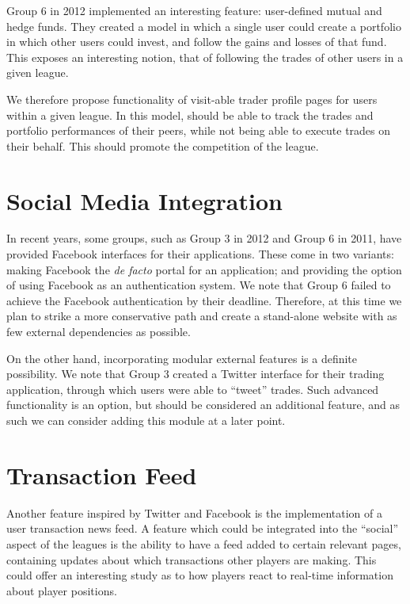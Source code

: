 \documentclass[11pt,letterpaper,oneside]{memoir}
\begin{document}
Group 6 in 2012 implemented an interesting feature: user-defined mutual and hedge funds.
They created a model in which a single user could create a portfolio in which other 
users could invest, and follow the gains and losses of that fund. This exposes an interesting
notion, that of following the trades of other users in a given league. 

We therefore propose functionality of visit-able trader profile pages for 
users within a given league. In this model, should be able to track the trades 
and portfolio performances of their peers, while not being able to execute trades 
on their behalf. This should promote the competition of the league.

\section{Social Media Integration}

In recent years, some groups, such as Group 3 in 2012 and Group 6 in 2011, have provided
Facebook interfaces for their applications. These come in two variants: making Facebook
the \emph{de facto} portal for an application; and providing the option of using Facebook
as an authentication system. We note that Group 6 failed to achieve the Facebook authentication
by their deadline. Therefore, at this time we plan to strike a more conservative path and
create a stand-alone website with as few external dependencies as possible.

On the other hand, incorporating modular external features is a definite possibility. We note
that Group 3 created a Twitter interface for their trading application, through which users
were able to ``tweet'' trades. Such advanced functionality is an option, but should be considered
an additional feature, and as such we can consider adding this module at a later point.

\section{Transaction Feed}

Another feature inspired by Twitter and Facebook is the implementation of a user transaction
news feed. A feature which could be integrated into the ``social'' aspect of the leagues
is the ability to have a feed added to certain relevant pages, containing updates about 
which transactions other players are making. This could offer an interesting study as to how
players react to real-time information about player positions.
\end{document}
